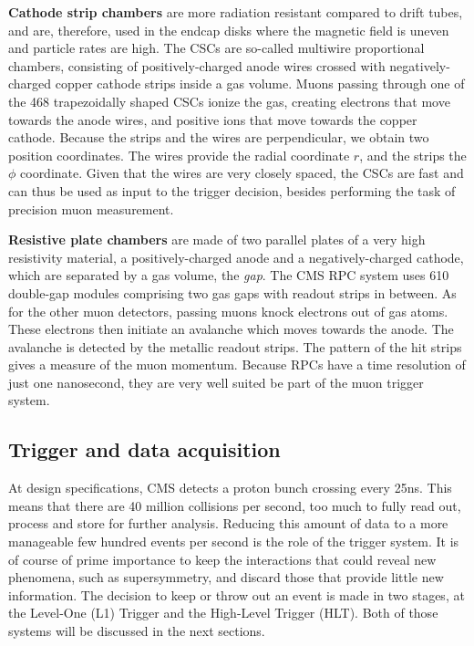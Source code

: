 \textbf{Cathode strip chambers} are more radiation resistant compared to drift tubes, and are,
therefore, used in the endcap disks where the magnetic field is uneven and particle rates are high. 
The CSCs are so-called multiwire proportional chambers, consisting of positively-charged anode wires
crossed with negatively-charged copper cathode strips inside a gas volume. Muons passing through
one of the 468 trapezoidally shaped CSCs ionize the gas, creating electrons that move
towards the anode wires, and positive ions that move towards the copper cathode. 
Because the strips and the wires are perpendicular, we obtain two position coordinates. The
wires provide the radial coordinate $r$, and the strips the $\phi$ coordinate. 
Given that the wires are very closely spaced, the CSCs are fast and can thus be used as input to the
trigger decision, besides performing the task of precision muon measurement. 

\textbf{Resistive plate chambers} are made of two parallel plates of a very high resistivity
material, a positively-charged anode and a negatively-charged cathode, which are separated by a gas
volume, the \textit{gap}. The CMS RPC system uses 610 double-gap modules comprising two gas gaps
with readout strips in between. 
As for the other muon detectors, passing muons knock electrons out of gas atoms. These electrons
then initiate an avalanche which moves towards the anode. The avalanche is detected by the metallic
readout strips. The pattern of the hit strips gives a measure of the muon momentum. Because RPCs
have a time resolution of just one nanosecond, they are very well suited be part of the muon trigger
system. 



\subsection{Trigger and data acquisition \label{sec:cms_tdaq}}

At design specifications, CMS detects a proton bunch crossing every 25\unit{ns}. This means that
there are 40 million collisions per second, too much to fully read out, process and store for
further analysis. Reducing this amount of data to a more manageable few hundred events
per second is the role of the trigger system. It is of course of prime importance to keep the
interactions that could reveal new phenomena, such as supersymmetry, and discard those that provide
little new information. 
The decision to keep or throw out an event is made in two stages, at the Level-One (L1) Trigger and
the High-Level Trigger (HLT). Both of those systems will be discussed in the next sections. 

